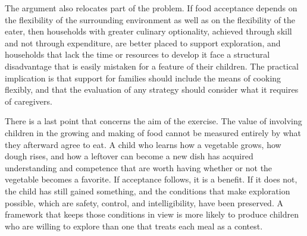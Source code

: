 \documentclass[11pt]{article}
\theoremstyle{remark}
\begin{document}
The argument also relocates part of the problem. If food acceptance depends on the flexibility of the surrounding environment as well as on the flexibility of the eater, then households with greater culinary optionality, achieved through skill and not through expenditure, are better placed to support exploration, and households that lack the time or resources to develop it face a structural disadvantage that is easily mistaken for a feature of their children. The practical implication is that support for families should include the means of cooking flexibly, and that the evaluation of any strategy should consider what it requires of caregivers.

There is a last point that concerns the aim of the exercise. The value of involving children in the growing and making of food cannot be measured entirely by what they afterward agree to eat. A child who learns how a vegetable grows, how dough rises, and how a leftover can become a new dish has acquired understanding and competence that are worth having whether or not the vegetable becomes a favorite. If acceptance follows, it is a benefit. If it does not, the child has still gained something, and the conditions that make exploration possible, which are safety, control, and intelligibility, have been preserved. A framework that keeps those conditions in view is more likely to produce children who are willing to explore than one that treats each meal as a contest.
\end{document}
